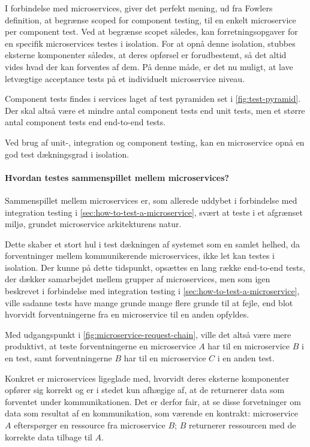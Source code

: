 \documentclass{article}
\begin{document}
I forbindelse med microservices, giver det perfekt mening, ud fra Fowlers definition, at begrænse scoped for component testing, til en enkelt microservice per component test. Ved at begrænse scopet således, kan forretningsopgaver for en specifik microservices testes i isolation. For at opnå denne isolation, stubbes eksterne komponenter således, at deres opførsel er forudbestemt, så det altid vides hvad der kan forventes af dem. På denne måde, er det nu muligt, at lave letvægtige acceptance tests på et individuelt microservice niveau.

Component tests findes i services laget af test pyramiden set i \cref{fig:test-pyramid}. Der skal altså være et mindre antal component tests end unit tests, men et større antal component tests end end-to-end tests.

Ved brug af unit-, integration og component testing, kan en microservice opnå en god test dækningsgrad i isolation.

\paragraph{Hvordan testes sammenspillet mellem microservices?}\label{sec:how-to-test-microservice-collaboration}

Sammenspillet mellem microservices er, som allerede uddybet i forbindelse med integration testing i \ref{sec:how-to-test-a-microservice}, svært at teste i et afgrænset miljø, grundet microservice arkitekturens natur.

Dette skaber et stort hul i test dækningen af systemet som en samlet helhed, da forventninger mellem kommunikerende microservices, ikke let kan testes i isolation. Der kunne på dette tidspunkt, opsættes en lang række end-to-end tests, der dækker samarbejdet mellem grupper af microservices, men som igen beskrevet i forbindelse med integration testing i \ref{sec:how-to-test-a-microservice}, ville sadanne tests have mange grunde mange flere grunde til at fejle, end blot hvorvidt forventningerne fra en microservice til en anden opfyldes.

Med udgangspunkt i \cref{fig:microservice-request-chain}, ville det altså være mere produktivt, at teste forventningerne en microservice $A$ har til en microservice $B$ i en test, samt forventningerne $B$ har til en microservice $C$ i en anden test.

Konkret er microservices ligeglade med, hvorvidt deres eksterne komponenter opfører sig korrekt og er i stedet kun afhægige af, at de returnerer data som forventet under kommunikationen. Det er derfor fair, at se disse forvetninger om data som resultat af en kommunikation, som værende en kontrakt: microservice $A$ efterspørger en ressource fra microservice $B$; $B$ returnerer ressourcen med de korrekte data tilbage til $A$.
\end{document}
